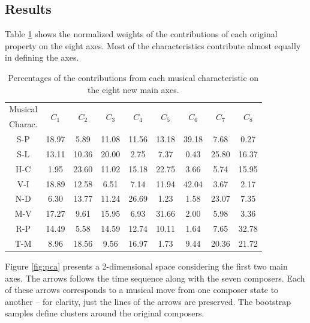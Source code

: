 \documentclass[
 aip,
 jmp,
 amsmath,amssymb,
 reprint,
]{revtex4-1}
\begin{document}
\subsection{Results}

Table \ref{tab:Deviates} shows the normalized weights
of the contributions of each original property on the eight
axes. Most of the characteristics contribute almost equally
in defining the axes. 

\begin{table}[ht]
\caption{\label{tab:Deviates}Percentages of
the contributions from each musical characteristic on the eight
new main axes.}

\begin{tabular}{|c||c|c|c|c|c|c|c|c|}
\hline
Musical         & \multirow{2}{*}{$C_1$} & \multirow{2}{*}{$C_2$} & \multirow{2}{*}{$C_3$} & \multirow{2}{*}{$C_4$} & \multirow{2}{*}{$C_5$} & \multirow{2}{*}{$C_6$} & \multirow{2}{*}{$C_7$} & \multirow{2}{*}{$C_8$}\\
Charac. & & & & & & & & \\
\hline
 S-P              &  18.97  &   5.89  & 11.08 & 11.56 &  13.18  &  39.18  &  7.68 &  0.27 \\
 S-L              &  13.11  &  10.36  & 20.00 &  2.75 &   7.37  &   0.43  & 25.80 & 16.37 \\
 H-C              &   1.95  &  23.60  & 11.02 & 15.18 &  22.75  &   3.66  &  5.74 & 15.95 \\
 V-I              &  18.89  &  12.58  &  6.51 &  7.14 &  11.94  &  42.04  &  3.67 &  2.17 \\
 N-D              &   6.30  &  13.77  & 11.24 & 26.69 &   1.23  &   1.58  & 23.07 &  7.35 \\
 M-V              &  17.27  &   9.61  & 15.95 &  6.93 &  31.66  &   2.00  &  5.98 &  3.36 \\
 R-P              &  14.49  &   5.58  & 14.59 & 12.74 &  10.11  &   1.64  &  7.65 & 32.78 \\
 T-M              &   8.96  &  18.56  &  9.56 & 16.97 &   1.73  &   9.44  & 20.36 & 21.72 \\
\hline
\end{tabular}
\end{table}

Figure \ref{fig:pca} presents a 2-dimensional space considering the
first two main axes. The arrows follows the time sequence along with the seven
composers. Each of these arrows corresponds to a musical move from one
composer state to another -- for clarity, just the lines of the arrows
are preserved. The bootstrap
samples define clusters around the original
composers.
\end{document}
